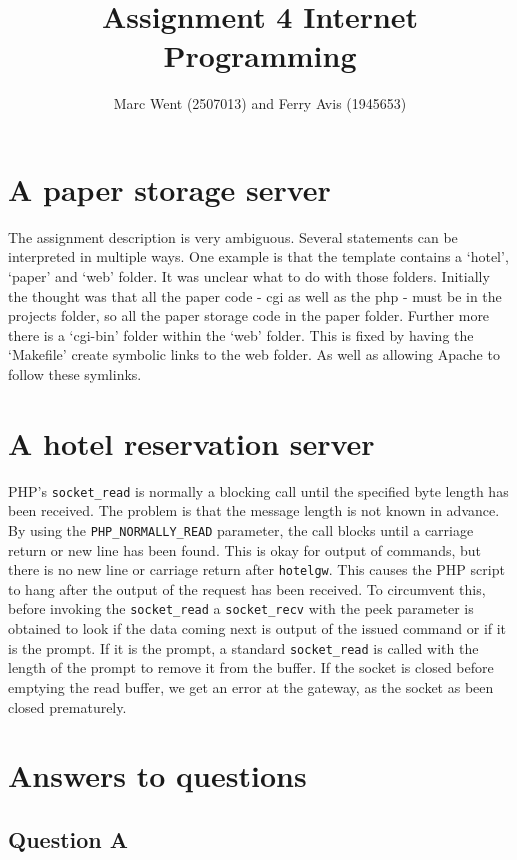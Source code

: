 \documentclass[11pt]{article}
\title{Assignment 4 Internet Programming}
\author{Marc Went (2507013) and Ferry Avis (1945653)}
\begin{document}
\maketitle
\section{A paper storage server}

The assignment description is very ambiguous. Several statements can be interpreted in multiple ways. One example is that the template contains a `hotel', `paper' and `web' folder. It was unclear what to do with those folders. Initially the thought was that all the paper code - cgi as well as the php - must be in the projects folder, so all the paper storage code in the paper folder. Further more there is a `cgi-bin' folder within the `web' folder.
This is fixed by having the `Makefile' create symbolic links to the web folder. As well as allowing Apache to follow these symlinks. 

\section{A hotel reservation server}

PHP's \texttt{socket\_read} is normally a blocking call until the specified byte length has been received. The problem is that the message length is not known in advance. By using the \texttt{PHP\_NORMALLY\_READ} parameter, the call blocks until a carriage return or new line has been found. This is okay for output of commands, but there is no new line or carriage return after \texttt{hotelgw}. This causes the PHP script to hang after the output of the request has been received. To circumvent this, before invoking the \texttt{socket\_read} a \texttt{socket\_recv} with the peek parameter is obtained to look if the data coming next is output of the issued command or if it is the prompt. If it is the prompt, a standard \texttt{socket\_read} is called with the length of the prompt to remove it from the buffer. If the socket is closed before emptying the read buffer, we get an error at the gateway, as the socket as been closed prematurely.

\section{Answers to questions}

\subsection{Question A}
\end{document}

